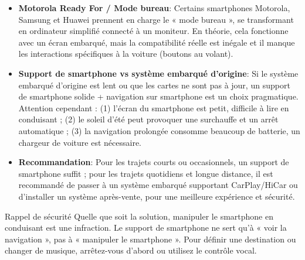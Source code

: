 \begin{itemize}
  \item \textbf{Motorola Ready For / Mode bureau}: Certains smartphones Motorola, Samsung et Huawei prennent en charge le « mode bureau », se transformant en ordinateur simplifié connecté à un moniteur. En théorie, cela fonctionne avec un écran embarqué, mais la compatibilité réelle est inégale et il manque les interactions spécifiques à la voiture (boutons au volant).
  \item \textbf{Support de smartphone vs système embarqué d'origine}: Si le système embarqué d'origine est lent ou que les cartes ne sont pas à jour, un support de smartphone solide + navigation sur smartphone est un choix pragmatique. Attention cependant : (1) l'écran du smartphone est petit, difficile à lire en conduisant ; (2) le soleil d'été peut provoquer une surchauffe et un arrêt automatique ; (3) la navigation prolongée consomme beaucoup de batterie, un chargeur de voiture est nécessaire.
  \item \textbf{Recommandation}: Pour les trajets courts ou occasionnels, un support de smartphone suffit ; pour les trajets quotidiens et longue distance, il est recommandé de passer à un système embarqué supportant CarPlay/HiCar ou d'installer un système après-vente, pour une meilleure expérience et sécurité.
\end{itemize}

\begin{tcbwarn}{Rappel de sécurité}
Quelle que soit la solution, manipuler le smartphone en conduisant est une infraction. Le support de smartphone ne sert qu'à « voir la navigation », pas à « manipuler le smartphone ». Pour définir une destination ou changer de musique, arrêtez-vous d'abord ou utilisez le contrôle vocal.

\end{tcbwarn}



